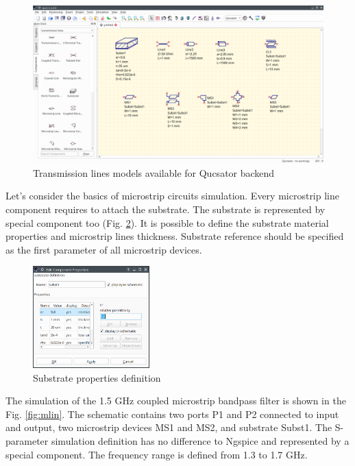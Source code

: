 \documentclass[a4paper,12pt]{article}
\begin{document}
    \begin{figure}[!ht]
    \begin{center}
        \includegraphics[width=\textwidth]{img/tlines.png}
    \end{center}
    \caption{Transmission lines models available for Qucsator backend} \label{fig:tlines}
    \end{figure}
    
Let's consider the basics of microstrip circuits simulation. Every microstrip line component requires to attach the substrate. The substrate is represented by special component too (Fig. \ref{fig:subst}). It is possible to define the substrate material properties and microstrip lines thickness. Substrate reference should be specified as the first parameter of all microstrip devices.

    \begin{figure}[!ht]
    \begin{center}
        \includegraphics[width=0.4\textwidth]{img/substr.png}
    \end{center}
    \caption{Substrate properties definition} \label{fig:subst}
    \end{figure}
    
The simulation of the 1.5 GHz coupled microstrip bandpass filter is shown in the Fig. \ref{fig:mlin}. The schematic contains two ports P1 and P2 connected to input and output, two microstrip devices MS1 and MS2, and substrate Subst1. The S-parameter simulation definition has no difference to Ngspice and represented by a special component. The frequency range is defined from 1.3 to 1.7 GHz.  
\end{document}
